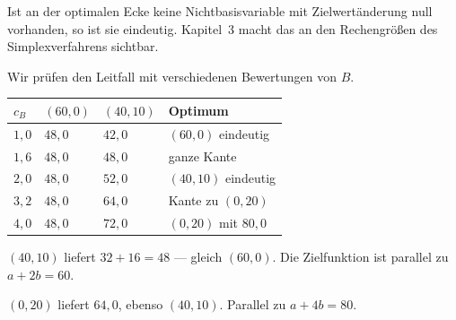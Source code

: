 \begin{aufgabe}
 Ist an der optimalen Ecke keine Nichtbasisvariable mit Zielwertänderung null vorhanden, so ist sie eindeutig. Kapitel~3 macht das an den Rechengrößen des Simplexverfahrens sichtbar.

Wir prüfen den Leitfall mit verschiedenen Bewertungen von $B$.

\begin{center}
{\small
\renewcommand{\arraystretch}{1.46}
\begin{tabular}{@{}P{1.8cm}P{1.8cm}P{1.8cm}P{2.4cm}@{}}
\toprule
$c_B$ & $(60,0)$ & $(40,10)$ & \textbf{Optimum}\\
\midrule
$1{,}0$ & $48{,}0$ & $42{,}0$ & $(60,0)$ eindeutig\\
$1{,}6$ & $48{,}0$ & $48{,}0$ & \textcolor{akzent}{ganze Kante}\\
$2{,}0$ & $48{,}0$ & $52{,}0$ & $(40,10)$ eindeutig\\
$3{,}2$ & $48{,}0$ & $64{,}0$ & \textcolor{akzent}{Kante zu $(0,20)$}\\
$4{,}0$ & $48{,}0$ & $72{,}0$ & $(0,20)$ mit $80{,}0$\\
\bottomrule
\end{tabular}}
\end{center}

 $(40,10)$ liefert $32+16 = 48$ --- gleich $(60,0)$. Die Zielfunktion ist parallel zu $a+2b=60$.

 $(0,20)$ liefert $64{,}0$, ebenso $(40,10)$. Parallel zu $a+4b=80$.

\begin{center}
\begin{minipage}{0.88\textwidth}
\end{minipage}
\end{center}
\end{aufgabe}

